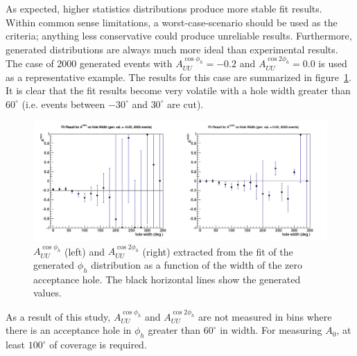 As expected, higher statistics distributions produce more stable fit results.
Within common sense limitations, a worst-case-scenario should be used as the criteria; anything less conservative could produce unreliable results.
Furthermore, generated distributions are always much more ideal than experimental results.
The case of 2000 generated events with $A_{UU}^{\cos\phi_h} = -0.2$ and $A_{UU}^{\cos 2\phi_h} = 0.0$ is used as a representative example.
The results for this case are summarized in figure~\ref{fig:holeWidthStudySummary}.
It is clear that the fit results become very volatile with a hole width greater than $60^\circ$ (i.e. events between $-30^\circ$ and $30^\circ$ are cut).
%
\begin{figure}[htp]
\centering
\includegraphics[width=6in]{figures/holeWidthStudySummary.png}
\caption{$A_{UU}^{\cos\phi_h}$ (left) and $A_{UU}^{\cos 2\phi_h}$ (right) extracted from the fit of the generated $\phi_h$ distribution as a function of the width of the zero acceptance hole. The black horizontal lines show the generated values.}
\label{fig:holeWidthStudySummary}
\end{figure}

As a result of this study, $A_{UU}^{\cos\phi_h}$ and $A_{UU}^{\cos 2\phi_h}$ are not measured in bins where there is an acceptance hole in $\phi_h$ greater than $60^\circ$ in width.
For measuring $A_0$, at least $100^\circ$ of coverage is required.

